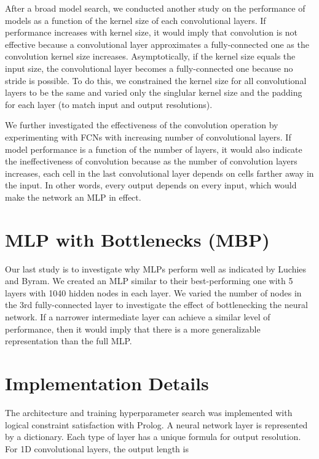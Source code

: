   After a broad model search, we conducted another study on the performance of models as a function of the kernel size of each convolutional layers. If performance increases with kernel size, it would imply that convolution is not effective because a convolutional layer approximates a fully-connected one as the convolution kernel size increases. Asymptotically, if the kernel size equals the input size, the convolutional layer becomes a fully-connected one because no stride is possible. To do this, we constrained the kernel size for all convolutional layers to be the same and varied only the singlular kernel size and the padding for each layer (to match input and output resolutions).

  We further investigated the effectiveness of the convolution operation by experimenting with FCNs with increasing number of convolutional layers. If model performance is a function of the number of layers, it would also indicate the ineffectiveness of convolution because as the number of convolution layers increases, each cell in the last convolutional layer depends on cells farther away in the input. In other words, every output depends on every input, which would make the network an MLP in effect.


  \section{MLP with Bottlenecks (MBP)}
  Our last study is to investigate why MLPs perform well as indicated by Luchies and Byram. We created an MLP similar to their best-performing one with 5 layers with 1040 hidden nodes in each layer. We varied the number of nodes in the 3rd fully-connected layer to investigate the effect of bottlenecking the neural network. If a narrower intermediate layer can achieve a similar level of performance, then it would imply that there is a more generalizable representation than the full MLP.



\section{Implementation Details}
The architecture and training hyperparameter search was implemented with logical constraint satisfaction with Prolog. A neural network layer is represented by a dictionary. Each type of layer has a unique formula for output resolution. For 1D convolutional layers, the output length is

